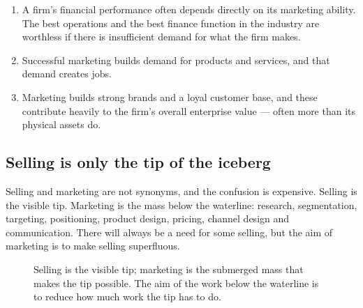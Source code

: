 \documentclass{MMTextbook}
\begin{document}
\begin{enumerate}
\item {} A firm's financial performance often depends
      directly on its marketing ability. The best operations and the best
      finance function in the industry are worthless if there is insufficient
      demand for what the firm makes.
\item {} Successful marketing builds demand for products
      and services, and that demand creates jobs.
\item {} Marketing builds strong brands and a loyal
      customer base, and these contribute heavily to the firm's overall
      enterprise value --- often more than its physical assets do.
\end{enumerate}

\subsection{Selling is only the tip of the iceberg}

Selling and marketing are not synonyms, and the confusion is expensive.
Selling is the visible tip. Marketing is the mass below the waterline:
research, segmentation, targeting, positioning, product design, pricing,
channel design and communication. There will always be a need for some
selling, but the aim of marketing is to make selling superfluous.

\begin{figure}[htbp]
\centering
{}
\caption[Selling as the tip of the marketing iceberg]%
        {Selling is the visible tip; marketing is the submerged mass that makes
         the tip possible. The aim of the work below the waterline is to reduce
         how much work the tip has to do.}
\label{fig:iceberg}
\end{figure}
\end{document}
